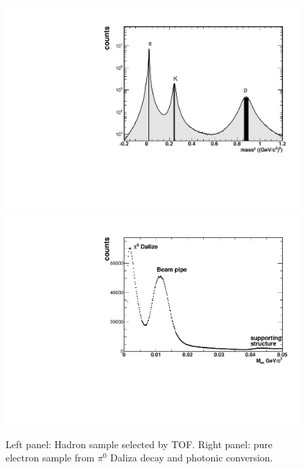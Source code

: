 \begin{figure}
\begin{centering}
\includegraphics[angle=270,scale=0.35]{fig/3.Analysis/Additional/BasicQA/QA_fig3}\includegraphics[angle=270,scale=0.35]{fig/3.Analysis/Additional/purity/fig5}
\par\end{centering}

\protect\caption{Left panel: Hadron sample selected by TOF. Right panel: pure electron
sample from $\pi^{0}$ Daliza decay and photonic conversion.}


\label{fig: pure sample}
\end{figure}


